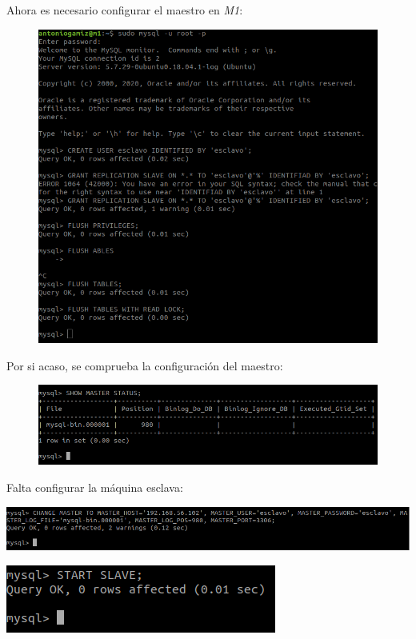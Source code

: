 \documentclass[12pt]{article}
\begin{document}
Ahora es necesario configurar el maestro en \textit{M1}:
\begin{figure}[H]
\center
\includegraphics[scale=0.35]{17.png}
\end{figure}
Por si acaso, se comprueba la configuración del maestro:
\begin{figure}[H]
\center
\includegraphics[scale=0.35]{18.png}
\end{figure}
Falta configurar la máquina esclava:
\begin{center}
\includegraphics[scale=0.35]{19.png}

\includegraphics[scale=0.35]{20.png}
\end{center}
\end{document}
